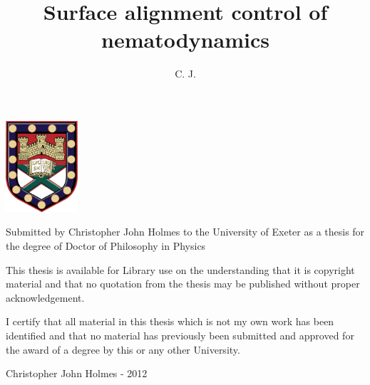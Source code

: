 \documentclass[prb, reprint, superscriptaddress, eqsecnum]{revtex4-1}
\begin{document}
\onecolumngrid
\begin{adjustwidth}{1in}{1in}
\begin{center}
\includegraphics[width=0.2\textwidth]{figures/crest}
\end{center}

\vspace{0.5cm}
\small
\noindent Submitted by Christopher John Holmes to the University of Exeter as a thesis for the degree of Doctor of Philosophy in Physics

\vspace{0.5cm}

\noindent This thesis is available for Library use on the understanding that it is copyright material and that no quotation from the thesis may be published without proper acknowledgement.

\vspace{0.5cm}

\noindent I certify that all material in this thesis which is not my own work has been identified and that no material has previously been submitted and approved for the award of a degree by this or any other University.

\vspace{0.5cm}

\noindent Christopher John Holmes - 2012
\end{adjustwidth}


\title{Surface alignment control of nematodynamics}
\author{C. J. }
\end{document}
